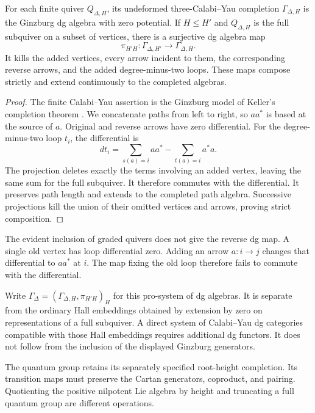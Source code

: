 \begin{theorem}
For each finite quiver \(Q_{\Delta,H}\), its undeformed
three-Calabi--Yau completion \(\Gamma_{\Delta,H}\) is the
Ginzburg dg algebra with zero potential. If \(H\le H'\) and
\(Q_{\Delta,H}\) is the full subquiver on a subset of vertices,
there is a surjective dg algebra map
\[
 \pi_{H'H}:\Gamma_{\Delta,H'}\longrightarrow\Gamma_{\Delta,H}.
\]
It kills the added vertices, every arrow incident to them, the
corresponding reverse arrows, and the added degree-minus-two loops.
These maps compose strictly and extend continuously to the completed algebras.
\end{theorem}
\begin{proof}
The finite Calabi--Yau assertion is the Ginzburg model of Keller's
completion theorem \cite{KellerCY,GinzburgCY}. We concatenate
paths from left to right, so \(aa^*\) is based at the source
of \(a\). Original and reverse arrows have zero differential.
For the degree-minus-two loop \(t_i\), the differential is
\[
 d t_i=\sum_{s(a)=i}aa^*-\sum_{t(a)=i}a^*a.
\]
The projection deletes exactly the terms involving an added vertex,
leaving the same sum for the full subquiver. It therefore commutes
with the differential. It preserves path length and extends to the
completed path algebra. Successive projections kill the union of
their omitted vertices and arrows, proving strict composition.
\end{proof}

The evident inclusion of graded quivers does not give the reverse
dg map. A single old vertex has loop differential zero. Adding
an arrow \(a:i\to j\) changes that differential to \(aa^*\)
at \(i\). The map fixing the old loop therefore fails to commute
with the differential.

Write \(\Gamma_\Delta=(\Gamma_{\Delta,H},\pi_{H'H})_H\)
for this pro-system of dg algebras. It is separate from the
ordinary Hall embeddings obtained by extension by zero on
representations of a full subquiver. A direct system of
Calabi--Yau dg categories compatible with those Hall embeddings
requires additional dg functors. It does not follow from the
inclusion of the displayed Ginzburg generators.

The quantum group retains its separately specified root-height
completion. Its transition maps must preserve the Cartan generators,
coproduct, and pairing. Quotienting the positive nilpotent Lie
algebra by height and truncating a full quantum group are different
operations.

